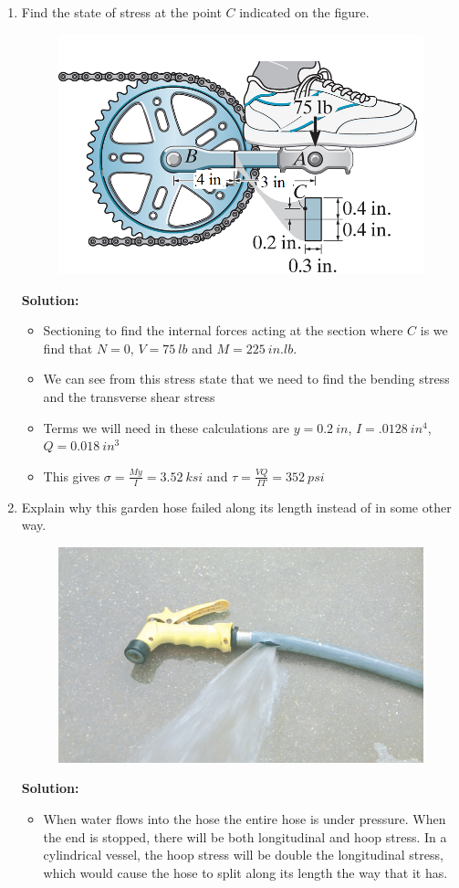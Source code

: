 \documentclass[12pt, oneside]{article}
\let\US\SI
\begin{document}
\begin{enumerate}
	\item %
		Find the state of stress at the point $C$ indicated on the figure.
		\begin{figure}[H]
			\centering
			\includegraphics[width=0.6\linewidth]{3-2b}
		\end{figure}
			\textbf{Solution:}
			\begin{itemize}
				\item Sectioning to find the internal forces acting at the section where $C$ is we find that $N = 0$, $V = \US{75}{lb}$ and $M = \US{225}{in.lb}$.
				\item We can see from this stress state that we need to find the bending stress and the transverse shear stress
				\item Terms we will need in these calculations are $y = \US{0.2}{in}$, $I = \US{.0128}{in^4}$, $Q = \US{0.018}{in^3}$
				\item This gives $\sigma = \frac{My}{I} = \US{3.52}{ksi}$ and $\tau = \frac{VQ}{IT} = \US{352}{psi}$
			\end{itemize}

	\item %
		Explain why this garden hose failed along its length instead of in some other way.
		\begin{figure}[H]
			\centering
			\includegraphics[width=0.6\linewidth]{C8-1}
		\end{figure}
			\textbf{Solution:}
			\begin{itemize}
				\item When water flows into the hose the entire hose is under pressure. 
					When the end is stopped, there will be both longitudinal and hoop stress.
					In a cylindrical vessel, the hoop stress will be double the longitudinal stress, which would cause the hose to split along its length the way that it has.
			\end{itemize}


\end{enumerate}
\end{document}
